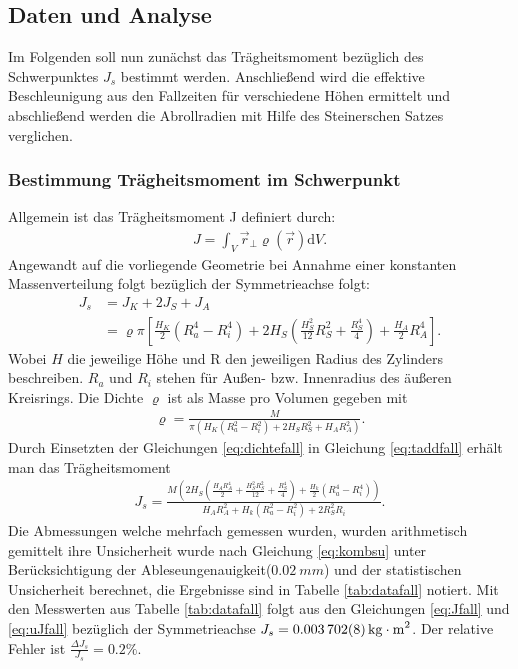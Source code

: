 \subsection{Daten und Analyse} %
Im Folgenden soll nun zunächst das Trägheitsmoment bezüglich des Schwerpunktes $J_s$ bestimmt werden. Anschließend wird die effektive Beschleunigung aus den Fallzeiten für verschiedene Höhen ermittelt und abschließend werden die Abrollradien mit Hilfe des Steinerschen Satzes verglichen.

\subsubsection{Bestimmung Trägheitsmoment im Schwerpunkt}

Allgemein ist das Trägheitsmoment J definiert durch:
\begin{align}
J= \int_{V} \vec{r}_{\perp} \varrho (\vec{r}) \mathrm{d}V.
\end{align}
Angewandt auf die vorliegende Geometrie bei Annahme einer konstanten Massenverteilung folgt bezüglich der Symmetrieachse folgt: 
\begin{align}
J_s&= J_{K}+2J_{S}+J_{A}\\
&=\varrho \pi \left[\frac{H_K}{2} (R_a^4-R_i^4)+  2 H_S(\frac{H_S^2}{12} R_S^2+\frac{R_S^4}{4})+  \frac{H_A}{2}R_A^4  \right] \label{eq:taddfall}.
\end{align}	
Wobei $H$ die jeweilige Höhe und R den jeweiligen Radius des Zylinders beschreiben. $R_a$ und $R_i$ stehen für Außen- bzw. Innenradius des äußeren Kreisrings. Die Dichte $\varrho$ ist als Masse pro Volumen gegeben mit
\begin{align}
	\varrho=\frac{M}{\pi(H_K  (R_a^2-R_i^2)+2 H_S  R_S^2+ H_A  R_A^2)}. \label{eq:dichtefall}
\end{align} 
Durch Einsetzten der Gleichungen \ref{eq:dichtefall} in Gleichung \ref{eq:taddfall} erhält man das Trägheitsmoment
\begin{align}
J_s=\frac{M \left(2 H_{S} \left(\frac{H_{A} R_{A}^{4}}{2} + \frac{H_{S}^{2} R_{S}^{2}}{12} + \frac{R_{S}^{4}}{4}\right) + \frac{ H_{k}}{2} \left(R_{a}^{4} - R_{i}^{4}\right)\right)}{H_{A} R_{A}^{2} + H_{k} \left(R_{a}^{2} - R_{i}^{2}\right) + 2 R_{S}^{2} R_{i}} \label{eq:Jfall}.
\end{align}
Die Abmessungen welche mehrfach gemessen wurden, wurden arithmetisch gemittelt ihre Unsicherheit wurde nach Gleichung \ref{eq:kombsu} unter Berücksichtigung der Ableseungenauigkeit($\SI{0.02}{mm}$)  und der statistischen Unsicherheit berechnet, die Ergebnisse sind in Tabelle \ref{tab:datafall} notiert.
Mit den Messwerten aus Tabelle \ref{tab:datafall} folgt aus den Gleichungen \ref{eq:Jfall} und \ref{eq:uJfall} bezüglich der Symmetrieachse $J_s=\SI{0.003702 \pm 0.000008}{kg\cdot m^2}$. Der relative Fehler ist $\frac{\Delta J_s}{J_s}=0.2\%$. 



